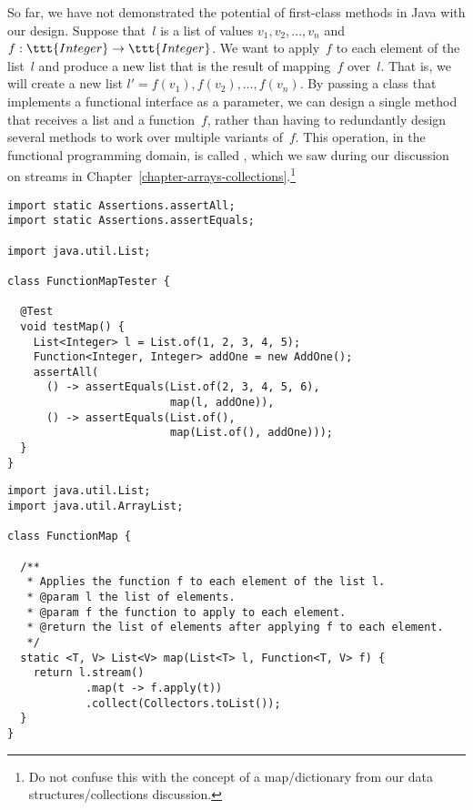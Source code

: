 So far, we have not demonstrated the potential of first-class methods in Java with our design. Suppose that~$l$ is a list of  values $v_1, v_2, ..., v_n$ and $f : \ttt{Integer} \to \ttt{Integer}$. 
We want to apply~$f$ to each element of the list~$l$ and produce a new list that is the result of mapping~$f$ over~$l$. 
That is, we will create a new list $l'=f(v_1), f(v_2), \ldots, f(v_n)$. 
By passing a class that implements a functional interface as a parameter, we can design a single method that receives a list and a function~$f$, rather than having to redundantly design several methods to work over multiple variants of~$f$. 
This operation, in the functional programming domain, is called , which we saw during our discussion on streams in Chapter~\ref{chapter-arrays-collections}.\footnote{Do not confuse this with the concept of a map/dictionary from our data structures/collections discussion.}

\enlargethispage{-5\baselineskip}
\begin{lstlisting}[language=MyJava]
import static Assertions.assertAll;
import static Assertions.assertEquals;

import java.util.List;

class FunctionMapTester {

  @Test
  void testMap() {
    List<Integer> l = List.of(1, 2, 3, 4, 5);
    Function<Integer, Integer> addOne = new AddOne();
    assertAll(
      () -> assertEquals(List.of(2, 3, 4, 5, 6), 
                         map(l, addOne)),
      () -> assertEquals(List.of(), 
                         map(List.of(), addOne)));
  }
}
\end{lstlisting}

\begin{lstlisting}[language=MyJava]
import java.util.List;
import java.util.ArrayList;

class FunctionMap {

  /**
   * Applies the function f to each element of the list l.
   * @param l the list of elements.
   * @param f the function to apply to each element.
   * @return the list of elements after applying f to each element.
   */
  static <T, V> List<V> map(List<T> l, Function<T, V> f) {
    return l.stream()
            .map(t -> f.apply(t))
            .collect(Collectors.toList());
  }
}
\end{lstlisting}

